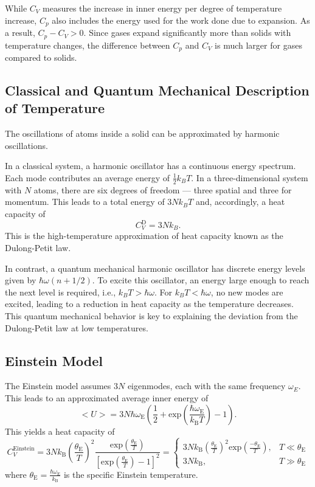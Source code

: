 While $C_V$ measures the increase in inner energy per degree of 
temperature increase, $C_p$ also includes the energy used for the work 
done due to expansion. As a result, $C_p-C_V>0$. Since gases expand 
significantly more than solids with temperature changes, the difference between 
$C_p$ and $C_V$ is much larger for gases compared to solids.

\subsection{Classical and Quantum Mechanical Description of Temperature}
The oscillations of atoms inside a solid can be approximated by 
harmonic oscillations. 

In a classical system, a harmonic oscillator has a continuous energy spectrum.
Each mode contributes an average energy of $\frac{1}{2}k_BT$. 
In a three-dimensional system with $N$ atoms, 
there are six degrees of freedom — three spatial and three for momentum.
This leads to a total energy of $3Nk_BT$ and, accordingly, 
a heat capacity of 
\begin{equation}
    C_V^\text{D}=3Nk_B. 
    \label{eqn:dulongpetit}    
\end{equation}
This is the high-temperature approximation of heat capacity known as the Dulong-Petit law.

In contrast, a quantum mechanical harmonic oscillator has discrete energy levels 
given by $\hbar\omega(n+1/2)$. To excite this oscillator, an energy 
large enough to reach the next level is required, i.e., $k_BT>\hbar\omega$.
For $k_BT<\hbar\omega$, no new modes are excited, leading to a reduction in heat capacity 
as the temperature decreases. This quantum mechanical behavior is key to explaining 
the deviation from the Dulong-Petit law at low temperatures.

\subsection{Einstein Model}
The Einstein model assumes $3N$ eigenmodes, each with the same frequency $\omega_E$.
This leads to an approximated average inner energy of 
\begin{equation}
    \bigl<U\bigr> = 3N \hbar\omega_\text{E} \left(\frac{1}{2} + \text{exp}\left(\frac{\hbar \omega_\text{E}}{k_\text{B}T}\right)
     - 1\right) .
\end{equation}
This yields a heat capacity of 
\begin{equation}
    C_V^\text{Einstein} = 3Nk_\text{B} \left(\frac{\theta_\text{E}}{T}\right)^2 \frac{\text{exp}\left(\frac{\theta_\text{E}}{T}\right)}
    {\left[\text{exp}\left(\frac{\theta_\text{E}}{T}\right) - 1\right]^2} = 
    \begin{cases}
        3Nk_\text{B} \left(\frac{\theta_\text{E}}{T}\right)^2 \text{exp}\left(\frac{-\theta_\text{E}}{T}\right), 
        & T \ll \theta_\text{E} \\
        3Nk_\text{B} , & T \gg \theta_\text{E}
    \end{cases}
\end{equation}
where $\theta_\text{E} = \frac{\hbar\omega_\text{E}}{k_\text{B}}$ is the specific 
Einstein temperature.


